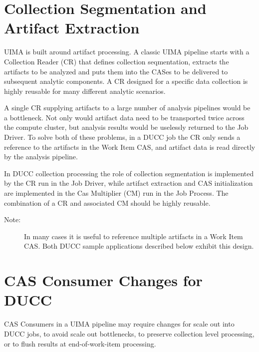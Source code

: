 \section{Collection Segmentation and Artifact Extraction}

UIMA is built around artifact processing. A classic UIMA pipeline starts with
a Collection Reader (CR) that defines collection seqmentation, extracts the artifacts
to be analyzed and puts them into the CASes to be delivered to subsequent analytic components. 
A CR designed for a specific data collection is highly reusable
for many different analytic scenarios.

A single CR supplying artifacts to a large number of analysis pipelines 
would be a bottleneck. Not only would artifact data need to be transported twice across
the compute cluster, but analysis results would be uselessly returned to the Job Driver.
To solve both of these problems, in a DUCC job the CR only sends a reference
to the artifacts in the Work Item CAS, and artifact data is read directly by the analysis pipeline.

In DUCC collection processing the role of collection segmentation is
implemented by the CR run in the Job Driver, while
artifact extraction and CAS initialization are implemented in the Cas Multiplier
(CM) run in the Job Process. The combination of a CR and associated CM 
should be highly reusable. 

\begin{description}
    \item[Note:] In many cases it is useful to reference multiple artifacts in a
      Work Item CAS. Both DUCC sample applications described below exhibit this design.
\end{description}

\section{CAS Consumer Changes for DUCC}

CAS Consumers in a UIMA pipeline may require changes for scale out into DUCC
jobs, to avoid scale out bottlenecks, to preserve collection level
processing, or to flush results at end-of-work-item processing.
   
